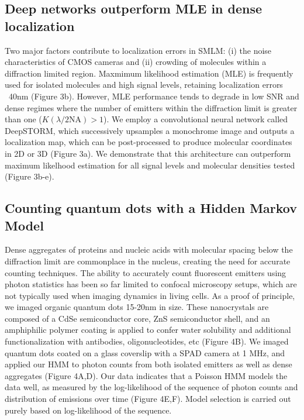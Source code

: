\documentclass{ucetd}
\begin{document}
\subsection{Deep networks outperform MLE in dense localization}

Two major factors contribute to localization errors in SMLM: (i) the noise characteristics of CMOS cameras and (ii) crowding of molecules within a diffraction limited region. Maxmimum likelihood estimation (MLE) is frequently used for isolated molecules and high signal levels, retaining localization errors ~40nm (Figure 3b). However, MLE performance tends to degrade in low SNR and dense regimes where the number of emitters within the diffraction limit is greater than one ($K(\lambda/2\mathrm{NA}) > 1$). We employ a convolutional neural network called DeepSTORM, which successively upsamples a monochrome image and outputs a localization map, which can be post-processed to produce molecular coordinates in 2D or 3D (Figure 3a).  We demonstrate that this architecture can outperform maximum likelhood estimation for all signal levels and molecular densities tested (Figure 3b-e).

\subsection{Counting quantum dots with a Hidden Markov Model}

Dense aggregates of proteins and nucleic acids with molecular spacing below the diffraction limit are commonplace in the nucleus, creating the need for accurate counting techniques. The ability to accurately count fluorescent emitters using photon statistics has been so far limited to confocal microscopy setups, which are not typically used when imaging dynamics in living cells. As a proof of principle, we imaged organic quantum dots 15-20nm in size. These nanocrystals are composed of a CdSe semiconductor core, ZnS semiconductor shell, and an amphiphilic polymer coating is applied to confer water solubility and additional functionalization with antibodies, oligonucleotides, etc (Figure 4B). We imaged quantum dots coated on a glass coverslip with a SPAD camera at 1 MHz, and applied our HMM to photon counts from both isolated emitters as well as dense aggregates (Figure 4A,D). Our data indicates that a Poisson HMM models the data well, as measured by the log-likelihood of the sequence of photon counts and distribution of emissions over time (Figure 4E,F). Model selection is carried out purely based on log-likelihood of the sequence.
\end{document}
